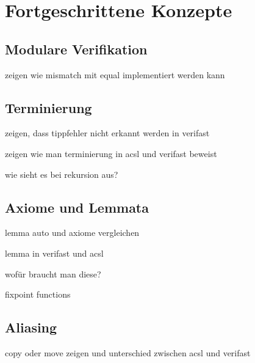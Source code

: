 ﻿
\chapter{Fortgeschrittene Konzepte}

\section{Modulare Verifikation}

zeigen wie mismatch mit equal implementiert werden kann


\section{Terminierung}

zeigen, dass tippfehler nicht erkannt werden in verifast

zeigen wie man terminierung in acsl und verifast beweist

wie sieht es bei rekursion aus?


\section{Axiome und Lemmata}

lemma auto und axiome vergleichen

lemma in verifast und acsl

wofür braucht man diese?

fixpoint functions

\section{Aliasing}

copy oder move zeigen und unterschied zwischen acsl und verifast

